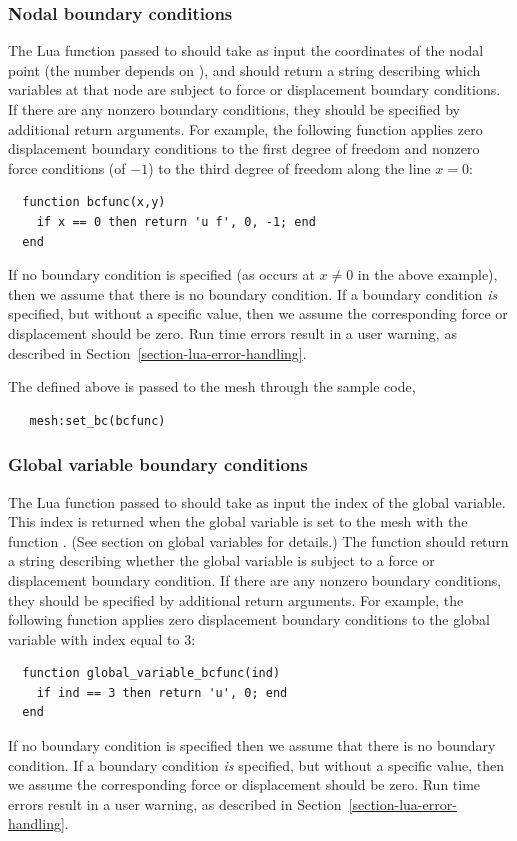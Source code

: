 \subsubsection{Nodal boundary conditions}
The Lua function passed to  should take as input the
coordinates of the nodal point (the number depends on ),
and should return a string describing which variables at that node are
subject to force or displacement boundary conditions.  If there are
any nonzero boundary conditions, they should be specified by
additional return arguments.  For example, the following function
applies zero displacement boundary conditions to the first degree of
freedom and nonzero force conditions (of $-1$) to the third degree of
freedom along the line $x = 0$:
\begin{verbatim}
  function bcfunc(x,y)
    if x == 0 then return 'u f', 0, -1; end
  end
\end{verbatim}
If no boundary condition is specified (as occurs at $x \neq 0$ in the
above example), then we assume that there is no boundary condition.
If a boundary condition \emph{is} specified, but without a specific
value, then we assume the corresponding force or displacement should
be zero.  Run time errors result in a user warning, as described in
Section~\ref{section-lua-error-handling}.

The  defined above is passed to the mesh through the sample
code,
\begin{verbatim}
   mesh:set_bc(bcfunc)
\end{verbatim}

\subsubsection{Global variable boundary conditions}
The Lua function passed to  should take as input the
index of the global variable. This index is returned when the global
variable is set to the mesh with the function .
(See section on global variables for details.)
The function should return a string describing whether the global variable
is subject to a force or displacement boundary condition.  If there are
any nonzero boundary conditions, they should be specified by
additional return arguments.  For example, the following function
applies zero displacement boundary conditions to the global variable
with index equal to 3:
\begin{verbatim}
  function global_variable_bcfunc(ind)
    if ind == 3 then return 'u', 0; end
  end
\end{verbatim}
If no boundary condition is specified then we assume that there 
is no boundary condition.
If a boundary condition \emph{is} specified, but without a specific
value, then we assume the corresponding force or displacement should
be zero.  Run time errors result in a user warning, as described in
Section~\ref{section-lua-error-handling}.

